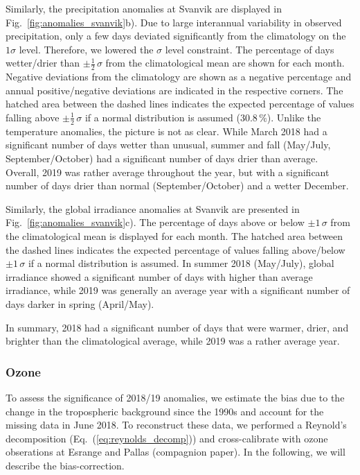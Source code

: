 \documentclass[bg, manuscript]{copernicus}
\begin{document}
Similarly, the precipitation anomalies at Svanvik are displayed in Fig.~\ref{fig:anomalies_svanvik}b). Due to large interannual variability in observed precipitation, only a few days deviated significantly from the climatology on the $1 \sigma$ level. Therefore, we lowered the $\sigma$ level constraint. The percentage of days wetter/drier than $\pm \frac{1}{2}\,\sigma$ from the climatological mean are shown for each month. Negative deviations from the climatology are shown as a negative percentage and annual positive/negative deviations are indicated in the respective corners. The hatched area between the dashed lines indicates the expected percentage of values falling above $\pm\frac{1}{2}\,\sigma$ if a normal distribution is assumed ($30.8\,\unit{\%}$). Unlike the temperature anomalies, the picture is not as clear. While March 2018 had a significant number of days wetter than unusual, summer and fall (May/July, September/October) had a significant number of days drier than average. Overall, 2019 was rather average throughout the year, but with a significant number of days drier than normal (September/October) and a wetter December.

Similarly, the global irradiance anomalies at Svanvik are presented in Fig.~\ref{fig:anomalies_svanvik}c). The percentage of days above or below $\pm 1\,\sigma$ from the climatological mean is displayed for each month. The hatched area between the dashed lines indicates the expected percentage of values falling above/below $\pm 1\,\sigma$ if a normal distribution is assumed. In summer 2018 (May/July), global irradiance showed a significant number of days with higher than average irradiance, while 2019 was generally an average year with a significant number of days darker in spring (April/May).

In summary, 2018 had a significant number of days that were warmer, drier, and brighter than the climatological average, while 2019 was a rather average year.

\subsubsection{Ozone}
\label{subsubsec:anomal_ozone}
To assess the significance of 2018/19 anomalies, we estimate the bias due to the change in the tropospheric background \chem{[O_3]} since the 1990s and account for the missing data in June 2018. To reconstruct these data, we performed a Reynold's decomposition (Eq.~(\ref{eq:reynolds_decomp})) and cross-calibrate with ozone obserations at Esrange and Pallas (compagnion paper). In the following, we will describe the bias-correction.
\end{document}
